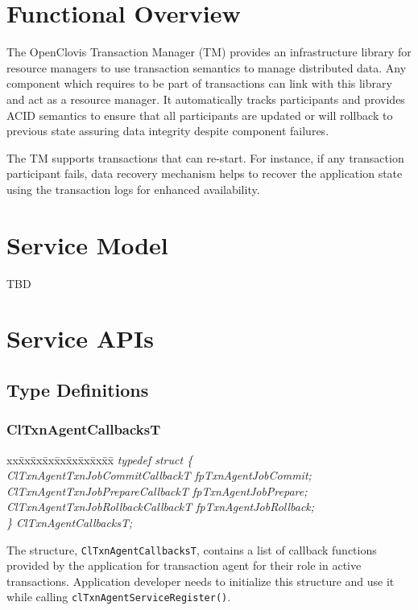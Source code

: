 
\hypertarget{group__group34}{
\chapter{Functional Overview}
\label{group__group34}
}


\begin{flushleft}
The OpenClovis Transaction Manager (TM) provides an infrastructure library for resource managers to use transaction semantics to manage 
distributed data. Any component which requires to be part of transactions can link with this library and act as a resource manager. It automatically 
tracks participants and provides ACID semantics to ensure that all participants are updated or will rollback to previous state assuring data integrity 
despite component failures. \par
 \par
 The TM supports transactions that can re-start. For instance, if any transaction participant fails, data recovery mechanism helps to recover the 
 application 
 state using the transaction logs for enhanced availability. 

\chapter{Service Model}
TBD


\chapter{Service APIs}



\section{Type Definitions}

\subsection{ClTxnAgentCallbacksT}
\begin{tabbing}
xx\=xx\=xx\=xx\=xx\=xx\=xx\=xx\=xx\=\kill
\textit{typedef struct \{}\\
\>\>\>\>\textit{ClTxnAgentTxnJobCommitCallbackT fpTxnAgentJobCommit;}\\
\>\>\>\>\textit{ClTxnAgentTxnJobPrepareCallbackT fpTxnAgentJobPrepare;}\\
\>\>\>\>\textit{ClTxnAgentTxnJobRollbackCallbackT fpTxnAgentJobRollback;}\\
\textit{\} ClTxnAgentCallbacksT;}\end{tabbing}
The structure, {\tt{ClTxnAgentCallbacksT}}, contains a list of callback functions provided by the application
for transaction agent for their role in active transactions. Application developer needs to
initialize this structure and use it while calling {\tt{clTxnAgentServiceRegister()}}.



\end{flushleft}
